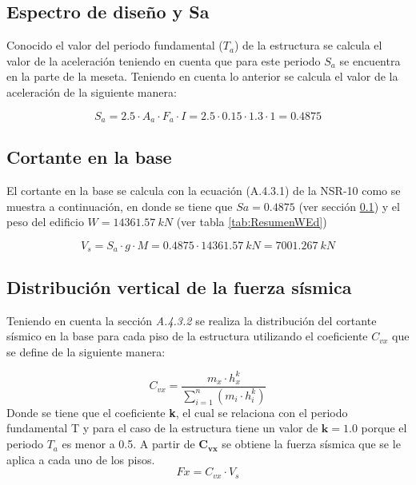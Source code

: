 \documentclass[12pt]{article}
\begin{document}
\subsection{Espectro de diseño y Sa}
\label{secc:espectro y sa}

Conocido el valor del periodo fundamental ($T_a$) de la estructura se calcula el valor de la aceleración teniendo en cuenta que para este periodo $S_a$ se encuentra en la parte de la meseta. Teniendo en cuenta lo anterior se calcula el valor de la aceleración de la siguiente manera:

\begin{equation*}
    S_{a}=2.5\cdot A_{a} \cdot F_{a} \cdot I= 2.5\cdot 0.15\cdot1.3\cdot1=0.4875
\end{equation*}
 \subsection{Cortante en la base}
 
 El cortante en la base se calcula con la ecuación (A.4.3.1) de la NSR-10 como se muestra a continuación, en donde se tiene que $Sa=0.4875$ (ver sección \ref{secc:espectro y sa}) y el peso del edificio $W=14361.57~kN$ (ver tabla \ref{tab:ResumenWEd})
 
 \begin{equation}
     V_{s}=S_{a}\cdot g \cdot M = 0.4875 \cdot 14361.57~kN= 7001.267~kN
 \end{equation}
 
\subsection{Distribución vertical de la fuerza sísmica}

Teniendo en cuenta la sección \textit{A.4.3.2} se realiza la distribución del cortante sísmico en la base para cada piso de la estructura utilizando el coeficiente $C_{vx}$ que se define de la siguiente manera:

\begin{equation}
    C_{vx}=\frac{m_{x}\cdot h_{x}^{k}}{\sum_{i=1}^{n}(m_{i}\cdot h_{i}^{k})}
\end{equation}
Donde se tiene que el coeficiente \textbf{k}, el cual se relaciona con el periodo fundamental T y para el caso de la estructura tiene un valor de $\mathbf{k=1.0}$ porque el periodo $T_{a}$ es menor a 0.5. A partir de $\mathbf{C_{vx}}$ se obtiene la fuerza sísmica que se le aplica a cada uno de los pisos.
\begin{equation}
    Fx=C_{vx}\cdot V_s
\end{equation}
\end{document}
